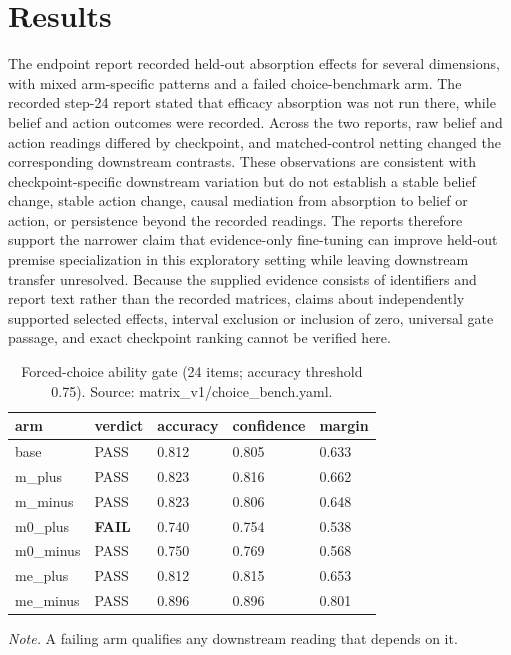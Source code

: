 \documentclass[10pt]{article}
\begin{document}
\section{Results}
The endpoint report recorded held-out absorption effects for several dimensions, with mixed arm-specific patterns and a failed choice-benchmark arm. The recorded step-24 report stated that efficacy absorption was not run there, while belief and action outcomes were recorded. Across the two reports, raw belief and action readings differed by checkpoint, and matched-control netting changed the corresponding downstream contrasts. These observations are consistent with checkpoint-specific downstream variation but do not establish a stable belief change, stable action change, causal mediation from absorption to belief or action, or persistence beyond the recorded readings. The reports therefore support the narrower claim that evidence-only fine-tuning can improve held-out premise specialization in this exploratory setting while leaving downstream transfer unresolved. Because the supplied evidence consists of identifiers and report text rather than the recorded matrices, claims about independently supported selected effects, interval exclusion or inclusion of zero, universal gate passage, and exact checkpoint ranking cannot be verified here.


\begin{table}[!t]
\centering
\footnotesize
\caption{ Forced-choice ability gate (24 items; accuracy threshold 0.75). Source: matrix\_v1/choice\_bench.yaml. }

\begin{tabular}{ lllll }
\toprule
arm & verdict & accuracy & confidence & margin \\
\midrule

base & PASS & 0.812 & 0.805 & 0.633 \\

m\_plus & PASS & 0.823 & 0.816 & 0.662 \\

m\_minus & PASS & 0.823 & 0.806 & 0.648 \\

m0\_plus & \textbf{ FAIL } & 0.740 & 0.754 & 0.538 \\

m0\_minus & PASS & 0.750 & 0.769 & 0.568 \\

me\_plus & PASS & 0.812 & 0.815 & 0.653 \\

me\_minus & PASS & 0.896 & 0.896 & 0.801 \\

\bottomrule
\end{tabular}

\par\footnotesize\emph{Note.} A failing arm qualifies any downstream reading that depends on it.
\end{table}
\end{document}
